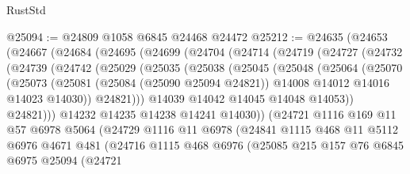 \begin{lexlean}{RustStd}
\begin{coremodule}
@25094 := @24809 @1058 @6845 @24468 @24472
@25212 := @24635
    (@24653
      (@24667
        (@24684
          (@24695
            (@24699
              (@24704
                (@24714
                  (@24719
                    (@24727
                      (@24732
                        (@24739
                          (@24742
                            (@25029
                              (@25035
                                (@25038
                                  (@25045
                                    (@25048
                                      (@25064
                                        (@25070
                                          (@25073
                                            (@25081
                                              (@25084 (@25090 @25094 @24821))
                                              @14008
                                              @14012
                                              @14016
                                              @14023
                                              @14030))
                                          @24821)))
                                    @14039
                                    @14042
                                    @14045
                                    @14048
                                    @14053))
                                @24821)))
                          @14232
                          @14235
                          @14238
                          @14241
                          @14030))
                      (@24721
                        @1116
                        @169
                        @11
                        @57
                        @6978
                        @5064
                        (@24729
                          @1116
                          @11
                          @6978
                          (@24841
                            @1115
                            @468
                            @11
                            @5112
                            @6976
                            @4671
                            @481
                            (@24716
                              @1115
                              @468
                              @6976
                              (@25085
                                @215
                                @157
                                @76
                                @6845
                                @6975
                                @25094
                                (@24721

\end{coremodule}
\end{lexlean}
